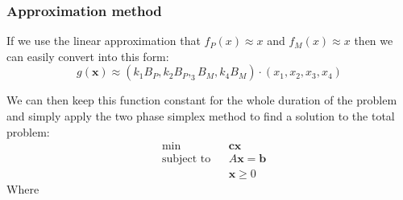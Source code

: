 \documentclass{article}
\begin{document}
\subsubsection{Approximation method}
\par If we use the linear approximation that $f_P(x) \approx x$ and $f_M(x) \approx x$ then we can easily convert into this form:
\begin{equation}
    g(\boldsymbol{x}) \approx(k_1 B_P, k_2 B_P, _3 B_M, k_4 B_M) \cdot(x_1,x_2,x_3,x_4)
\end{equation}
\par We can then keep this function constant for the whole duration of the problem and simply apply the two phase simplex method to find a solution to the total problem:
\begin{equation*}
\begin{aligned}
    &\min & & \boldsymbol{cx} \\
    &\text{subject to} & & A\boldsymbol{x}=\boldsymbol{b}\\
    & & &\boldsymbol{x} \geq 0
\end{aligned}
\end{equation*}
Where 
\end{document}
